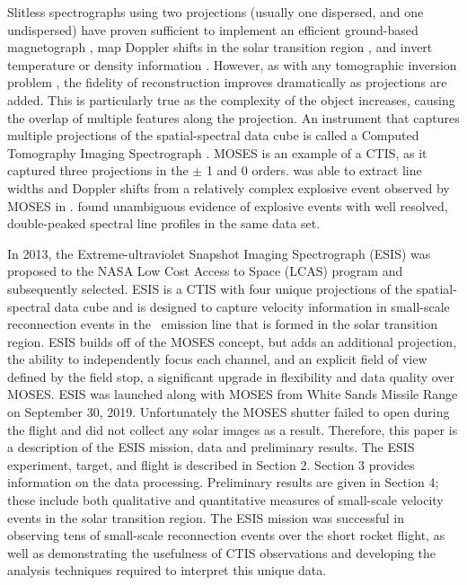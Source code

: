     Slitless spectrographs using two projections (usually one dispersed, and one undispersed) have proven sufficient to implement an efficient ground-based magnetograph \citep{DeforestStereoscopy2004}, map Doppler shifts in the solar transition region \citep{Courrier2018}, and invert temperature or density information \citep{winebarger2019}. 
    However, as with any tomographic inversion problem \citep[e.g.,][]{KakSlaney2001}, the fidelity of reconstruction improves dramatically as projections are added. 
    This is particularly true as the complexity of the object increases, causing the overlap of multiple features along the projection. 
    An instrument that captures multiple projections of the spatial-spectral data cube is called a Computed Tomography Imaging Spectrograph  \cite[CTIS,][]{DescourDereniakCTIS1995}.  
    MOSES is an example of a CTIS, as it captured three projections in the $\pm$ 1 and 0 orders.  
    \cite{Fox10} was able to extract line widths and Doppler shifts from a relatively complex explosive event observed by MOSES in \heii.  
    \cite{Rust2019} found unambiguous evidence of explosive events with well resolved, double-peaked spectral line profiles in the same data set.
    
    In 2013, the Extreme-ultraviolet Snapshot Imaging Spectrograph (ESIS) was proposed to the NASA Low Cost Access to Space (LCAS) program and subsequently selected.  
    ESIS is a CTIS with four unique projections of the spatial-spectral data cube and is designed to capture velocity information in small-scale reconnection events in the \ov \ emission line that is formed in the solar transition region. 
    ESIS builds off of the MOSES concept, but adds an additional projection, the ability to independently focus each channel, and an explicit field of view defined by the field stop, a significant upgrade in flexibility and data quality over MOSES.
    ESIS was launched along with MOSES from White Sands Missile Range on September 30,  2019.
    Unfortunately the MOSES shutter failed to open during the flight and did not collect any solar images as a result.
    Therefore, this paper is a description of the ESIS mission, data and preliminary results.  
    The ESIS experiment, target, and flight is described in Section 2.  
    Section 3 provides information on the data processing.  Preliminary results are given in Section 4; these include both qualitative and quantitative measures of small-scale velocity events in the solar transition region.  The ESIS mission was successful in  observing tens of small-scale reconnection events over the short rocket flight, as well as demonstrating the usefulness of CTIS observations and developing the analysis techniques required to interpret this unique data.


